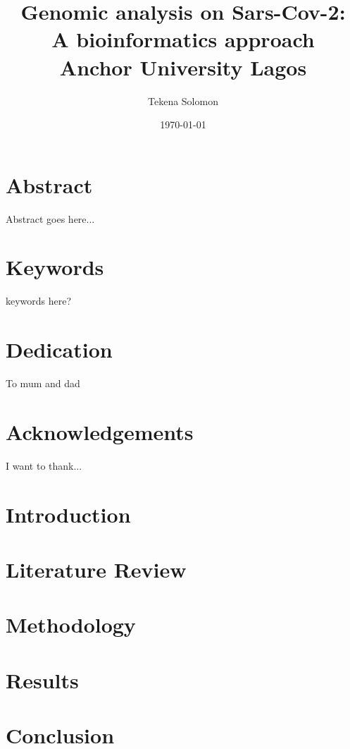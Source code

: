 \documentclass[12pt,paper=a4,twosided,cleardoubleage=plain,final]{report}
\title{
	{Genomic analysis on Sars-Cov-2: \\ A bioinformatics approach}\\
	{\large Anchor University Lagos}\\
	{\vspace{10mm}{\texttt{[image: university.png]}}}
}
\author{Tekena Solomon}
\date{\today}
\newcommand{\comment}[1]{}
\begin{document}
\maketitle

\chapter*{Abstract}
Abstract goes here... %


\chapter*{Keywords}
keywords here?

\chapter*{Dedication}
To mum and dad


\chapter*{Acknowledgements}
I want to thank...

\tableofcontents
\listoftables
\listoffigures

\chapter{Introduction}


\chapter{Literature Review}


\chapter{Methodology}


\chapter{Results}


\comment{summary, conclusion and recommendation}
\chapter{Conclusion}

\end{document}
